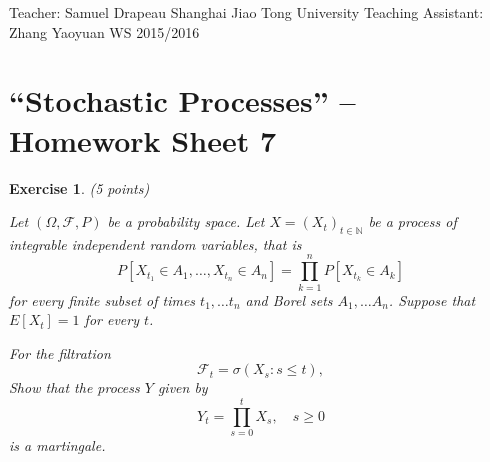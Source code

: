 \documentclass[DIV=classic,a4paper,10pt]{scrartcl}
\newtheorem{exercise}[theorem]{Exercise}
\theoremstyle{nonumberplain}
\numberwithin{equation}{section}
\begin{document}
\noindent
Teacher: Samuel Drapeau \hfill Shanghai Jiao Tong University \newline
Teaching Assistant: Zhang Yaoyuan \hfill WS 2015/2016

\smallskip
\noindent
\hrulefill

\smallskip

\setcounter{section}{7}

\pagestyle{empty}


\section*{``Stochastic Processes'' -- Homework Sheet 7}
\thispagestyle{empty}




\begin{exercise}(5 points)
    
    Let $(\Omega,\mathcal{F},P)$ be a probability space.
    Let $X=(X_t)_{t\in \mathbb{N}}$ be a process of integrable independent random variables, that is
    \begin{equation*}
        P\left[ X_{t_1}\in A_1,\ldots,X_{t_n}\in A_n \right]=\prod_{k=1}^nP[X_{t_k}\in A_k]
    \end{equation*}
    for every finite subset of times $t_1,\ldots t_n$ and Borel sets $A_1,\ldots A_n$.
    Suppose that $E[X_t]=1$ for every $t$.

    For the filtration
    \begin{equation*}
        \mathcal{F}_t=\sigma(X_s\colon s\leq t), 
    \end{equation*}
    Show that the process $Y$ given by
    \begin{equation*}
        Y_t=\prod_{s=0}^t X_s, \quad s\geq 0
    \end{equation*}
    is a martingale.
\end{exercise}
\end{document}
